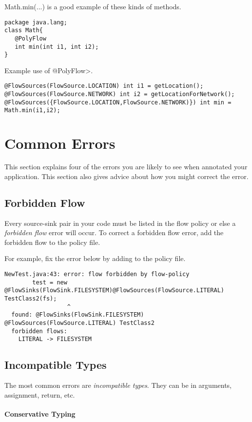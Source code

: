   Math.min(...) is a good example of these kinds of methods. 
  
  \begin{Verbatim}
package java.lang;
class Math{
   @PolyFlow  
   int min(int i1, int i2);
}
\end{Verbatim}

Example use of \<@PolyFlow>.
\begin{Verbatim}
@FlowSources(FlowSource.LOCATION) int i1 = getLocation();
@FlowSources(FlowSource.NETWORK) int i2 = getLocationForNetwork();
@FlowSources({FlowSource.LOCATION,FlowSource.NETWORK)}) int min = Math.min(i1,i2);
 \end{Verbatim}

\section{Common Errors\label{errors}}

This section explains four of the errors you are likely to see when annotated your application.  This section also gives advice about how you might correct the error.   

\subsection{Forbidden Flow}  
Every source-sink pair in your code must be listed in the flow policy or else a \emph{forbidden flow} error will occur.
To correct a forbidden flow error, add the forbidden flow to the policy file. 
  
For example, fix the error below by adding  to the policy file.
\begin{Verbatim}
NewTest.java:43: error: flow forbidden by flow-policy  
        test = new @FlowSinks(FlowSink.FILESYSTEM)@FlowSources(FlowSource.LITERAL) TestClass2(fs);
                  ^
  found: @FlowSinks(FlowSink.FILESYSTEM) @FlowSources(FlowSource.LITERAL) TestClass2 
  forbidden flows:
    LITERAL -> FILESYSTEM
\end{Verbatim}

\subsection{Incompatible Types}
The most common errors are \emph{incompatible types}.  They can be in arguments,  assignment, return, etc.

\paragraph{Conservative Typing}

